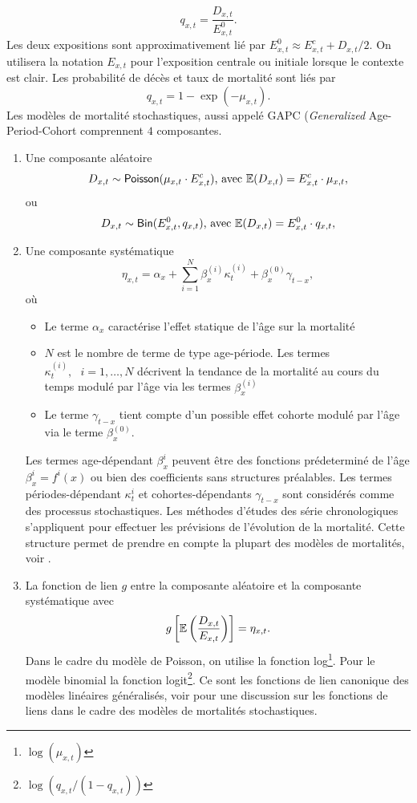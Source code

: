$$
q_{x,t} = \frac{D_{x,t}}{E_{x,t}^0}.
$$
Les deux expositions sont approximativement lié par $E_{x,t}^0\approx E_{x,t}^c +D_{x,t}/2$. On utilisera la notation $E_{x,t}$ pour l'exposition centrale ou initiale lorsque le contexte est clair. Les probabilité de décès et taux de mortalité sont liés par
$$
q_{x,t}=1-\exp(-\mu_{x,t}).
$$
Les modèles de mortalité stochastiques, aussi appelé GAPC (\textit{Generalized} Age-Period-Cohort comprennent $4$ composantes.
\begin{enumerate}  
  \item Une composante aléatoire  
  $$
D_{x,t}\sim \mathsf{Poisson}(\mu_{x,t}\cdot E_{x,t}^c)\text{, avec }\mathbb{E}(D_{x,t}) = E_{x,t}^c\cdot \mu_{x,t},
  $$
  ou
  $$
D_{x,t}\sim \mathsf{Bin}( E_{x,t}^0, q_{x,t})\text{, avec }\mathbb{E}(D_{x,t}) = E_{x,t}^0\cdot q_{x,t},
  $$
  \item Une composante systématique
  $$
\eta_{x,t} = \alpha_x + \sum_{i=1}^N \beta_{x}^{(i)}\kappa_{t}^{(i)}+\beta_{x}^{(0)}\gamma_{t-x},
  $$
  où
  \begin{itemize}
    \item Le terme $\alpha_x$ caractérise l'effet statique de l'âge sur la mortalité
    \item $N$ est le nombre de terme de type age-période. Les termes $\kappa_t^{(i)},\text{ }i=1,\ldots, N$ décrivent la tendance de la mortalité au cours du temps modulé par l'âge via les termes $\beta_x^{(i)}$
    \item Le terme $\gamma_{t-x}$ tient compte d'un possible effet cohorte modulé par l'âge via le terme $\beta_{x}^{(0)}$.
  \end{itemize}
  Les termes age-dépendant $\beta_x^{i}$ peuvent être des fonctions prédeterminé de l'âge $\beta_x^{i} = f^{i}(x)$ ou bien des coefficients sans structures préalables. Les termes périodes-dépendant $\kappa_t^{i}$ et cohortes-dépendants $\gamma_{t-x}$ sont considérés comme des processus stochastiques. Les méthodes d'études des série chronologiques s'appliquent pour effectuer les prévisions de l'évolution de la mortalité. Cette structure permet de prendre en compte la plupart des modèles de mortalités, voir \citet{Hunt2020}.
  \item La fonction de lien $g$ entre la composante aléatoire et la composante systématique avec 
  $$
  g\left[\mathbb{E}\left(\frac{D_{x,t}}{E_{x,t}}\right)\right] =  \eta_{x,t}.
  $$
  Dans le cadre du modèle de Poisson, on utilise la fonction log\footnote{$\log(\mu_{x,t})$}. Pour le modèle binomial la fonction logit\footnote{$\log(q_{x,t}/(1-q_{x,t}))$}. Ce sont les fonctions de lien canonique des modèles linéaires généralisés, voir \citet{Currie2014} pour une discussion sur les fonctions de liens dans le cadre des modèles de mortalités stochastiques.

\end{enumerate}
